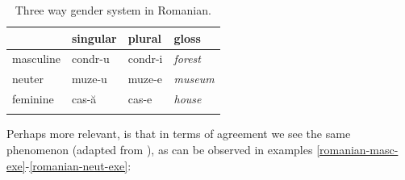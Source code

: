 \begin{table}[!htpb]
  \centering
  \begin{tabular}{llll}
    \lsptoprule
              & singular                   & plural                    & gloss           \\
    \midrule
    masculine & \cellcolor{gray!25}condr-u & condr-i                    & \textit{forest} \\
    neuter    & \cellcolor{gray!25}muze-u  & \cellcolor{gray!25}muze-e & \textit{museum} \\
    feminine  & cas-ă                      & \cellcolor{gray!25}cas-e  & \textit{house}  \\
    \lspbottomrule
  \end{tabular}
  \caption{Three way gender system in Romanian.}\label{tab:gender-rom}
\end{table}

Perhaps more relevant, is that in terms of agreement we see the same phenomenon (adapted from \textcite{Farkas.1990}), as can be observed in examples \ref{romanian-masc-exe}-\ref{romanian-neut-exe}:

